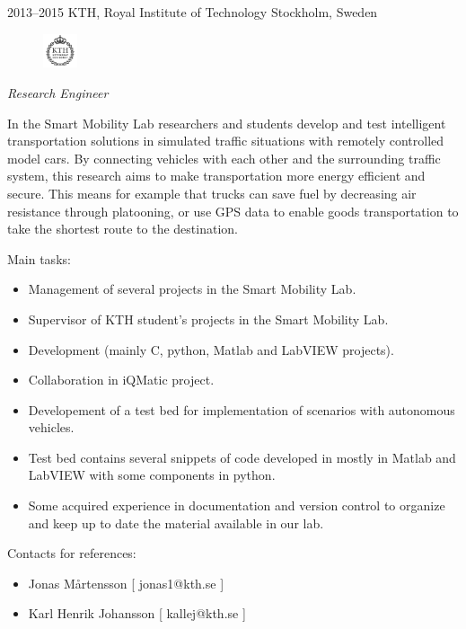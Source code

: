 \documentclass[]{friggeri-cv} %
\begin{document}
\begin{entrylist}
\entry
{2013--2015}
{KTH, Royal Institute of Technology}
{Stockholm, Sweden}
{
\begin{figure}
	\vspace{-20pt}
	\begin{center}
		\includegraphics[width=1cm,height=1cm]{kth}
	\end{center}
\end{figure}
\emph{Research Engineer}

In the Smart Mobility Lab researchers and students develop and test intelligent transportation solutions in simulated traffic situations with remotely controlled model cars. By connecting vehicles with each other and the surrounding traffic system, this research aims to make transportation more energy efficient and secure. This means for example that trucks can save fuel by decreasing air resistance through platooning, or use GPS data to enable goods transportation to take the shortest route to the destination.

Main tasks:
\begin{itemize}
	\item Management of several projects in the Smart Mobility Lab.
	\item Supervisor of KTH student's projects in the Smart Mobility Lab.
	\item Development (mainly C, python, Matlab and LabVIEW projects).
	\item Collaboration in iQMatic project.
	\item Developement of a test bed for implementation of scenarios with autonomous vehicles.
	\item Test bed contains several snippets of code developed in mostly in Matlab and LabVIEW with some components in python.
	\item Some acquired experience in documentation and version control to organize and keep up to date the material available in our lab.
\end{itemize}
Contacts for references:
\begin{itemize}
	\item Jonas Mårtensson [ jonas1@kth.se ]
	\item Karl Henrik Johansson [ kallej@kth.se ]
\end{itemize}
}

\end{entrylist}
\end{document}
